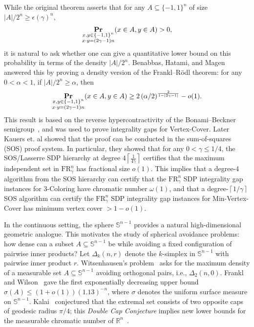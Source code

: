 \documentclass[11pt]{article}
\newcommand{\ceil}[1]{\left\lceil #1 \right\rceil}
\renewcommand{\Pr}{\mathop{\bf Pr\/}}
\newcommand{\FR}{{\mathrm{FR}_\gamma^n}}
\begin{document}
\smallskip
While the original theorem asserts that for any \( A \subseteq \{-1,1\}^n \) of size \( |A|/2^n \geq \epsilon(\gamma)^n \),
\[
\Pr_{\substack{x, y \in \{-1,1\}^n \\ x \cdot y = (2\gamma - 1)n}}(x \in A, y \in A) > 0,
\]
it is natural to ask whether one can give a quantitative lower bound on this probability in terms of the density \( |A| / 2^n \). Benabbas, Hatami, and Magen~\cite{benabbas2012isoperimetric} answered this by proving a density version of the Frankl–R\"{o}dl theorem: for any \( 0 < \alpha < 1 \), if \( |A| / 2^n \geq \alpha \), then
\[
\Pr_{\substack{x, y \in \{-1,1\}^n \\ x \cdot y = (2\gamma - 1)n}}(x \in A, y \in A) \geq 2\left(\alpha/2 \right)^{\frac{2}{1 - |2\gamma - 1|}} - o(1).
\]
This result is based on the reverse hypercontractivity of the Bonami–Beckner semigroup~\cite{mossel2006non}, and was used to prove integrality gaps for Vertex-Cover. Later Kauers et. al \cite{kauers2014hypercontractive} showed that the proof can be conducted in the sum-of-squares (SOS) proof system. In particular, they showed that for any $0<\gamma\leq 1/4$, the SOS/Lasserre SDP hierarchy at degree $4\ceil{\frac{1}{4\gamma}}$ certifies that the maximum independent set in $\FR$ has fractional size $o(1)$. This implies that a degree-4 algorithm from the SOS hierarchy can certify that the $\FR$ SDP integrality gap instances for 3-Coloring have chromatic number $\omega(1)$, and that a degree-$\ceil{1/\gamma}$ SOS algorithm can certify the $\FR$ SDP integrality gap instances for Min-Vertex-Cover has minimum vertex cover $>1-o(1)$.

\smallskip In the continuous setting, the sphere \( \mathbb{S}^{n-1} \) provides a natural high-dimensional geometric analogue. This motivates the study of spherical avoidance problems: how dense can a subset \( A \subseteq \mathbb{S}^{n-1} \) be while avoiding a fixed configuration of pairwise inner products? Let \( \Delta_k(n, r) \) denote the \( k \)-simplex in \( \mathbb{S}^{n-1} \) with pairwise inner product \( r \). Witsenhausen's problem~\cite{witsenhausen1974spherical} asks for the maximum density of a measurable set \( A \subseteq \mathbb{S}^{n-1} \) avoiding orthogonal pairs, i.e., \( \Delta_2(n, 0) \). Frankl and Wilson~\cite{frankl1981intersection} gave the first exponentially decreasing upper bound \( \sigma(A) \leq (1+o(1))(1.13)^{-n} \), where \( \sigma \) denotes the uniform surface measure on \( \mathbb{S}^{n-1} \). Kalai~\cite{kalai2009large} conjectured that the extremal set consists of two opposite caps of geodesic radius \( \pi/4 \); this \emph{Double Cap Conjecture} implies new lower bounds for the measurable chromatic number of \( \mathbb{R}^n \)~\cite{decorte2016spherical}. 
\end{document}
